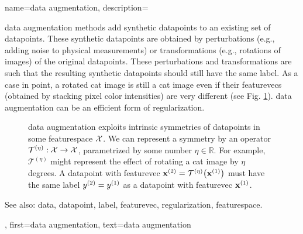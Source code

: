 {name={data augmentation},
	description={\Gls{data} augmentation methods add synthetic \glspl{datapoint} 
		to an existing set of \glspl{datapoint}. These synthetic \glspl{datapoint} are obtained by 
		perturbations (e.g., adding noise to physical measurements) or transformations 
		(e.g., rotations of images) of the original \glspl{datapoint}. These perturbations and 
		transformations are such that the resulting synthetic \glspl{datapoint} should 
		still have the same \gls{label}. As a case in point, a rotated cat image is still 
		a cat image even if their \glspl{featurevec} (obtained by stacking pixel color intensities) 
		are very different (see Fig. \ref{fig_symmetry_dataaug_dict}). \Gls{data} augmentation can be an 
		efficient form of \gls{regularization}.
		\begin{figure}[H]
		\begin{center}
			  \vspace*{-11mm}
		\end{center}
		\caption{\Gls{data} augmentation exploits intrinsic symmetries of \glspl{datapoint} in 
		       some \gls{featurespace} $\mathcal{X}$. We can represent a symmetry by 
		     an operator $\mathcal{T}^{(\eta)}: \mathcal{X} \rightarrow \mathcal{X}$,
		     parametrized by some number $\eta \in \mathbb{R}$. For example, $\mathcal{T}^{(\eta)}$ 
		    might represent the effect of rotating a cat image by $\eta$ degrees. A \gls{datapoint} 
		    with \gls{featurevec} ${\bf x}^{(2)} = \mathcal{T}^{(\eta)} \big({\bf x}^{(1)} \big)$ must 
		    have the same \gls{label} $y^{(2)}=y^{(1)}$ as a \gls{datapoint} 
		     with \gls{featurevec} ${\bf x}^{(1)}$.\label{fig_symmetry_dataaug_dict}}
		 \end{figure}
		See also: \gls{data}, \gls{datapoint}, \gls{label}, \gls{featurevec}, \gls{regularization}, \gls{featurespace}. },
	first={data augmentation},
	text={data augmentation}
}
	
